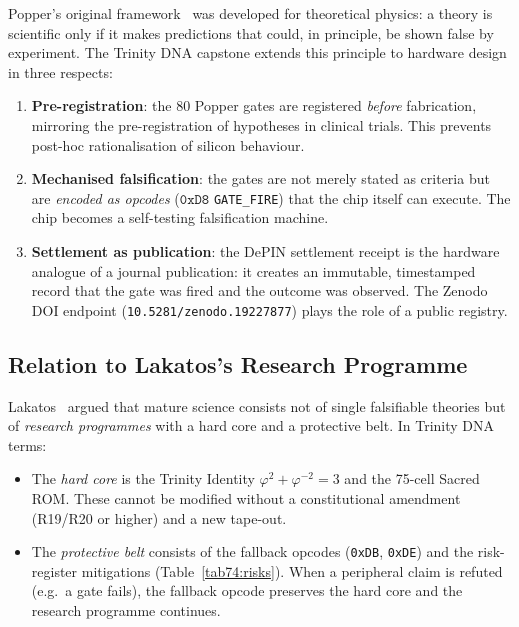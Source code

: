 Popper's original framework~\cite{popper1959} was developed for
theoretical physics: a theory is scientific only if it makes
predictions that could, in principle, be shown false by experiment.
The Trinity DNA capstone extends this principle to hardware design in
three respects:

\begin{enumerate}
  \item \textbf{Pre-registration}: the 80 Popper gates are registered
    \emph{before} fabrication, mirroring the pre-registration of
    hypotheses in clinical trials.  This prevents post-hoc
    rationalisation of silicon behaviour.

  \item \textbf{Mechanised falsification}: the gates are not merely
    stated as criteria but are \emph{encoded as opcodes}
    ($\mathtt{0xD8}$ \texttt{GATE\_FIRE}) that the chip itself can
    execute.  The chip becomes a self-testing falsification machine.

  \item \textbf{Settlement as publication}: the DePIN settlement receipt
    is the hardware analogue of a journal publication: it creates an
    immutable, timestamped record that the gate was fired and the
    outcome was observed.  The Zenodo DOI endpoint
    (\texttt{10.5281/zenodo.19227877}) plays the role of a public
    registry.
\end{enumerate}

\subsection{Relation to Lakatos's Research Programme}
\label{sec74:lakatos}

Lakatos~\cite{lakatos1970methodology} argued that mature science consists not of
single falsifiable theories but of \emph{research programmes} with a hard
core and a protective belt.  In Trinity DNA terms:

\begin{itemize}
  \item The \emph{hard core} is the Trinity Identity
    $\varphi^{2}+\varphi^{-2}=3$ and the 75-cell Sacred ROM.  These
    cannot be modified without a constitutional amendment (R19/R20 or
    higher) and a new tape-out.
  \item The \emph{protective belt} consists of the fallback opcodes
    (\texttt{0xDB}, \texttt{0xDE}) and the risk-register mitigations
    (Table~\ref{tab74:risks}).  When a peripheral claim is refuted
    (e.g.\ a gate fails), the fallback opcode preserves the hard core
    and the research programme continues.
\end{itemize}

